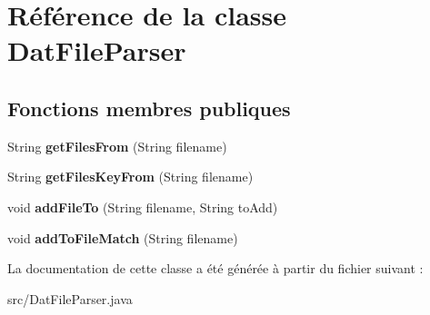 \hypertarget{classDatFileParser}{}\section{Référence de la classe Dat\+File\+Parser}
\label{classDatFileParser}
\subsection*{Fonctions membres publiques}
\begin{DoxyCompactItemize}
\item 
\mbox{\label{classDatFileParser_a5c4ee6b0aca7de30cd85f204f0c0af55}} 
String {\bfseries get\+Files\+From} (String filename)
\item 
\mbox{\label{classDatFileParser_aa49a20ed1ec20c61d5a8bb1feef18068}} 
String {\bfseries get\+Files\+Key\+From} (String filename)
\item 
\mbox{\label{classDatFileParser_acc90e46e22b2a3c1a1dc5a611a6be32b}} 
void {\bfseries add\+File\+To} (String filename, String to\+Add)
\item 
\mbox{\label{classDatFileParser_afc9c0a9e3264e7f93c663e63dcfeb13e}} 
void {\bfseries add\+To\+File\+Match} (String filename)
\end{DoxyCompactItemize}


La documentation de cette classe a été générée à partir du fichier suivant \+:\begin{DoxyCompactItemize}
\item 
src/Dat\+File\+Parser.\+java\end{DoxyCompactItemize}
